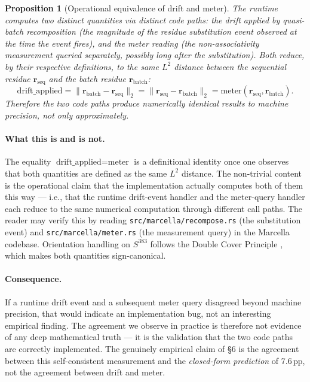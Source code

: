 \documentclass[11pt,letterpaper]{article}
\newtheorem{proposition}[theorem]{Proposition}
\begin{document}
\begin{proposition}[Operational equivalence of drift and meter]
\label{prop:meter}
The runtime computes two distinct quantities via distinct code
paths: the \emph{drift} applied by quasi-batch recomposition (the
magnitude of the residue substitution event observed at the time
the event fires), and the \emph{meter} reading (the
non-associativity measurement queried separately, possibly long
after the substitution). Both reduce, by their respective
definitions, to the same $L^2$ distance between the sequential
residue $\mathbf{r}_{\text{seq}}$ and the batch residue
$\mathbf{r}_{\text{batch}}$:
\[
\text{drift\_applied}
= \|\mathbf{r}_{\text{batch}} - \mathbf{r}_{\text{seq}}\|_2
= \|\mathbf{r}_{\text{seq}} - \mathbf{r}_{\text{batch}}\|_2
= \text{meter}(\mathbf{r}_{\text{seq}}, \mathbf{r}_{\text{batch}}).
\]
Therefore the two code paths produce numerically identical
results to machine precision, not only approximately.
\end{proposition}

\paragraph{What this is and is not.} The equality
$\text{drift\_applied} = \text{meter}$ is a definitional identity
once one observes that both quantities are defined as the same
$L^2$ distance. The non-trivial content is the operational claim
that the implementation actually computes both of them this way
--- i.e., that the runtime drift-event handler and the meter-query
handler each reduce to the same numerical computation through
different call paths. The reader may verify this by reading
\texttt{src/marcella/recompose.rs} (the substitution event) and
\texttt{src/marcella/meter.rs} (the measurement query) in the
Marcella codebase. Orientation handling on $S^{383}$ follows the
Double Cover Principle \cite{davis2026doublecover}, which makes
both quantities sign-canonical.

\paragraph{Consequence.}
If a runtime drift event and a subsequent meter query disagreed
beyond machine precision, that would indicate an implementation
bug, not an interesting empirical finding. The agreement we observe
in practice is therefore not evidence of any deep mathematical
truth --- it is the validation that the two code paths are
correctly implemented. The genuinely empirical claim of \S6 is the
agreement between this self-consistent measurement and the
\emph{closed-form prediction} of 7.6\,pp, not the agreement between
drift and meter.
\end{document}
